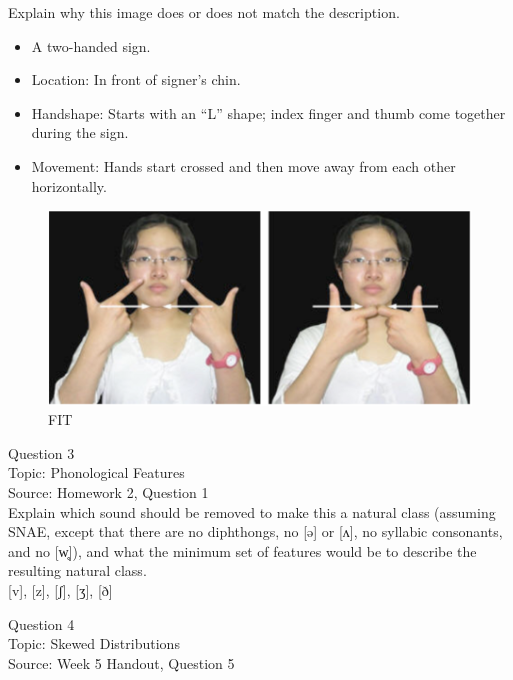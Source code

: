 \documentclass[12pt]{article}
\begin{document}
Explain why this image does or does not match the description.\\

\begin{itemize} \item A two-handed sign. \item Location: In front of signer’s chin. \item Handshape: Starts with an “L” shape; index finger and thumb come together during the sign. \item Movement: Hands start crossed and then move away from each other horizontally. \end{itemize}

\begin{figure}[H]
\includegraphics{../images/taiwansign_fit.png}
\caption{FIT}
\end{figure}

\newpage

{\large Question 3}\\

Topic: Phonological Features\\
Source: Homework 2, Question 1\\

Explain which sound should be removed to make this a natural class (assuming SNAE, except that there are no diphthongs, no [ə] or [ʌ], no syllabic consonants, and no [w̥]), and what the minimum set of features would be to describe the resulting natural class.\\

{[v]}, {[z]}, {[ʃ]}, {[ʒ]}, {[ð]}


\newpage

{\large Question 4}\\

Topic: Skewed Distributions\\
Source: Week 5 Handout, Question 5\\
\end{document}
